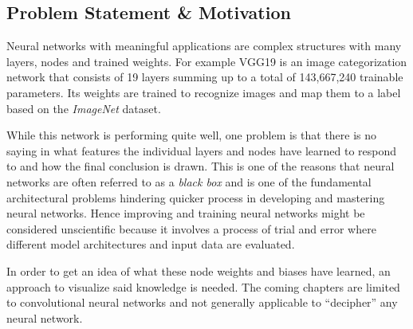 \subsection{Problem Statement \& Motivation}
\label{sec:problem-statement}
Neural networks with meaningful applications are complex structures with many layers, nodes and trained weights.
For example VGG19 is an image categorization network that consists of 19 layers summing up to a total of 143,667,240 trainable parameters.\cite{vgg} Its weights are trained to recognize images and map them to a label based on the \textit{ImageNet} dataset.\cite{imagenet}

While this network is performing quite well, one problem is that there is no saying in what features the individual layers and nodes have learned to respond to and how the final conclusion is drawn.\cite{castelvecchi2016can}
This is one of the reasons that neural networks are often referred to as a \textit{black box} and is one of the fundamental architectural problems hindering quicker process in developing and mastering neural networks.\cite{olden2002illuminating}
Hence improving and training neural networks might be considered unscientific because it involves a process of trial and error where different model architectures and input data are evaluated.\cite{zeiler2014visualizing}


In order to get an idea of what these node weights and biases have learned, an approach to visualize said knowledge is needed.
The coming chapters are limited to convolutional neural networks and not generally applicable to \enquote{decipher} any neural network.